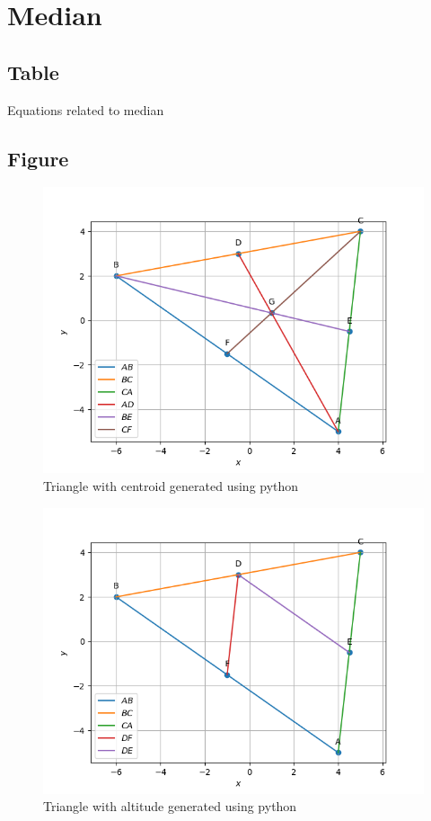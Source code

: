 \documentclass[journal,12pt,onecolumn]{IEEEtran}
\theoremstyle{remark}
\begin{document}
\section{Median}
\subsection{Table}
\begin{table}[!htb]
	
	\caption{Equations related to median}
	\label{tab58:equations_median}	
\end{table}
\FloatBarrier
\subsection{Figure}
\begin{figure}[!htb]
	\centering
	\includegraphics[width=\columnwidth]{figs/2.png}
	\caption{Triangle with centroid generated using python}
	\label{fig58:Triangle_with_centroid}	
\end{figure}
\begin{figure}[!htb]
	\centering
	\includegraphics[width=\columnwidth]{figs/2_7.png}
	\caption{Triangle with altitude generated using python}
	\label{fig58:Triangle_with_altitude}	
\end{figure}
\FloatBarrier
\end{document}
